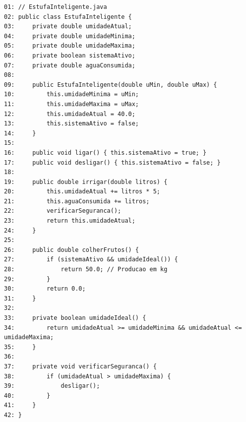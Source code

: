\documentclass[12pt,a4paper]{article}
\begin{document}
\begin{enumerate}
    \begin{center}
    \end{center}
\begin{small}
\begin{lstlisting}
01: // EstufaInteligente.java
02: public class EstufaInteligente {
03:     private double umidadeAtual;
04:     private double umidadeMinima;
05:     private double umidadeMaxima;
06:     private boolean sistemaAtivo;
07:     private double aguaConsumida;
08: 
09:     public EstufaInteligente(double uMin, double uMax) {
10:         this.umidadeMinima = uMin;
11:         this.umidadeMaxima = uMax;
12:         this.umidadeAtual = 40.0;
13:         this.sistemaAtivo = false;
14:     }
15: 
16:     public void ligar() { this.sistemaAtivo = true; }
17:     public void desligar() { this.sistemaAtivo = false; }
18: 
19:     public double irrigar(double litros) {
20:         this.umidadeAtual += litros * 5;
21:         this.aguaConsumida += litros;
22:         verificarSeguranca();
23:         return this.umidadeAtual;
24:     }
25: 
26:     public double colherFrutos() {
27:         if (sistemaAtivo && umidadeIdeal()) {
28:             return 50.0; // Producao em kg
29:         }
30:         return 0.0;
31:     }
32: 
33:     private boolean umidadeIdeal() {
34:         return umidadeAtual >= umidadeMinima && umidadeAtual <= umidadeMaxima;
35:     }
36: 
37:     private void verificarSeguranca() {
38:         if (umidadeAtual > umidadeMaxima) {
39:             desligar();
40:         }
41:     }
42: }
\end{lstlisting}
\end{small}


\end{enumerate}
\end{document}
